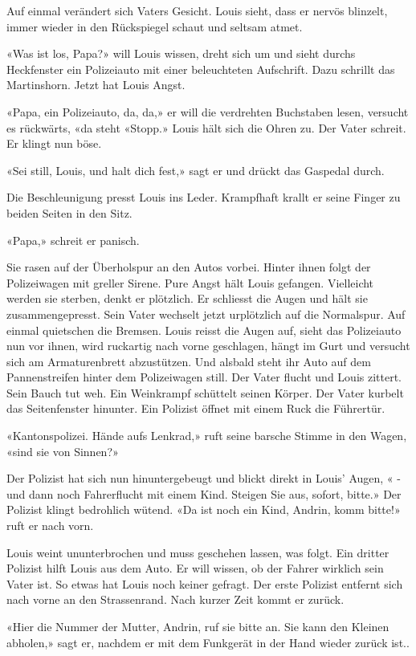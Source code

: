 {Auf einmal verändert sich Vaters Gesicht. Louis sieht, dass er nervös
blinzelt, immer wieder in den Rückspiegel schaut und seltsam atmet. 

«Was ist los, Papa?» will Louis wissen, dreht sich um und sieht durchs
Heckfenster ein Polizeiauto mit einer beleuchteten Aufschrift. Dazu
schrillt das Martinshorn. Jetzt hat Louis Angst. 

«Papa, ein Polizeiauto, da, da,» er will die verdrehten Buchstaben lesen, versucht es rückwärts,
«da steht «Stopp.» Louis hält sich die Ohren zu. Der Vater schreit. Er klingt nun böse. 

«Sei still, Louis, und halt dich fest,» sagt er und drückt das Gaspedal
durch. 

Die Beschleunigung presst Louis ins Leder. Krampfhaft krallt er
seine Finger zu beiden Seiten in den Sitz. 

«Papa,» schreit er panisch.

Sie rasen auf der Überholspur an den Autos vorbei. Hinter ihnen folgt
der Polizeiwagen mit greller Sirene. Pure Angst hält Louis gefangen.
Vielleicht werden sie sterben, denkt er plötzlich. Er schliesst die
Augen und hält sie zusammengepresst. Sein Vater wechselt jetzt urplötzlich auf die Normalspur. Auf einmal quietschen die Bremsen. Louis reisst die Augen auf, sieht das
Polizeiauto nun vor ihnen, wird ruckartig nach vorne
geschlagen, hängt im Gurt und versucht sich am Armaturenbrett
abzustützen. Und alsbald steht ihr Auto auf dem Pannenstreifen hinter dem Polizeiwagen still. Der Vater flucht und Louis
zittert. Sein Bauch tut weh. Ein Weinkrampf schüttelt seinen Körper. Der Vater kurbelt das Seitenfenster hinunter. Ein Polizist öffnet mit einem Ruck die Führertür.

«Kantonspolizei. Hände aufs Lenkrad,» ruft seine barsche Stimme in den
Wagen, «sind sie von Sinnen?»

Der Polizist hat sich nun hinuntergebeugt und blickt direkt in Louis’
Augen, « - und dann noch Fahrerflucht mit einem Kind. Steigen Sie aus,
sofort, bitte.» Der Polizist klingt bedrohlich wütend. «Da ist noch ein
Kind, Andrin, komm bitte!» ruft er nach vorn. 

Louis weint ununterbrochen und muss geschehen lassen, was folgt. 
Ein dritter Polizist hilft Louis aus dem Auto. Er will wissen, ob der Fahrer wirklich sein Vater ist. 
So etwas hat Louis noch keiner gefragt. Der erste Polizist entfernt sich nach vorne an den Strassenrand. Nach
kurzer Zeit kommt er zurück.

«Hier die Nummer der Mutter, Andrin, ruf sie bitte an. Sie kann den
Kleinen abholen,» sagt er, nachdem er mit dem Funkgerät in der Hand
wieder zurück ist.. 

}

